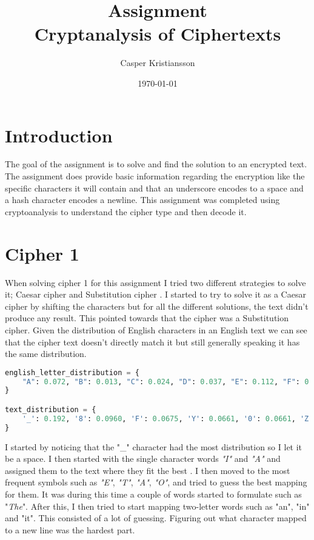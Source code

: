\documentclass{article}
\title{Assignment \\ Cryptanalysis of Ciphertexts}
\author{Casper Kristiansson}
\date{\today}
\begin{document}
\maketitle

\section*{Introduction}
The goal of the assignment is to solve and find the solution to an encrypted text. The assignment does provide basic information regarding the encryption like the specific characters it will contain and that an underscore encodes to a space and a hash character encodes a newline. This assignment was completed using cryptoanalysis to understand the cipher type and then decode it.

\section*{Cipher 1}
When solving cipher 1 for this assignment I tried two different strategies to solve it; Caesar cipher and Substitution cipher \cite{lecture2}. I started to try to solve it as a Caesar cipher by shifting the characters but for all the different solutions, the text didn't produce any result. This pointed towards that the cipher was a Substitution cipher. Given the distribution of English characters in an English text we can see that the cipher text doesn't directly match it but still generally speaking it has the same distribution.

\begin{lstlisting}[language=Python]
english_letter_distribution = {
    "A": 0.072, "B": 0.013, "C": 0.024, "D": 0.037, "E": 0.112, "F": 0.020, "G": 0.018, "H": 0.054, "I": 0.061, "J": 0.001, "K": 0.007, "L": 0.035, "M": 0.021, "N": 0.059, "O": 0.066, "P": 0.017, "Q": 0.001, "R": 0.053, "S": 0.056, "T": 0.080, "U": 0.024, "V": 0.009, "W": 0.021, "X": 0.001, "Y": 0.017, "Z": 0.001, "_": 0.120,
}

text_distribution = {
    '_': 0.192, '8': 0.0960, 'F': 0.0675, 'Y': 0.0661, '0': 0.0661, 'Z': 0.0541, '9': 0.0519, 'C': 0.0506, 'K': 0.0496, 'H': 0.0494, 'T': 0.0343, '5': 0.0323, 'O': 0.0257, 'B': 0.0236, 'I': 0.0218, 'W': 0.0211, 'E': 0.0179, '2': 0.0154, 'U': 0.0142, '#': 0.0118, '3': 0.0101, 'Q': 0.0098, 'L': 0.0087, '1': 0.0068, 'R': 0.0008, 'N': 0.0004, '6': 0.0002, 'X': 0.0001
}
\end{lstlisting}

I started by noticing that the "\_" character had the most distribution so I let it be a space. I then started with the single character words \textit{"I"} and \textit{"A"} and assigned them to the text where they fit the best \cite{Cryptogr8:online}. I then moved to the most frequent symbols such as \textit{"E"}, \textit{"T"}, \textit{"A"}, \textit{"O"}, and tried to guess the best mapping for them. It was during this time a couple of words started to formulate such as "\textit{The}". After this, I then tried to start mapping two-letter words such as "an", "in" and "it". This consisted of a lot of guessing. Figuring out what character mapped to a new line was the hardest part.
\end{document}
